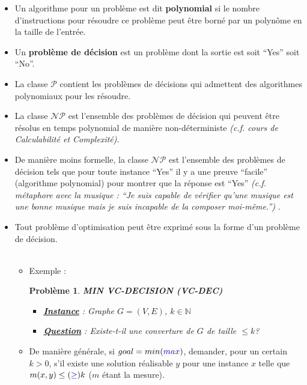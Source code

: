 \documentclass[12pt]{article}
\newcommand{\titre}[1]{\textcolor{title}{#1}}
\newcommand{\blu}[1]{\textcolor{darkblue}{#1}}
\newcommand{\N}{\mathbb{N}}
\newtheorem{pbm}{Problème}[section]
\begin{document}
\begin{itemize}
\item Un algorithme pour un problème est dit \textbf{polynomial} si le nombre
d'instructions pour résoudre ce problème peut être borné par un polynôme en la
taille de l'entrée.
\item Un \textbf{problème de décision} est un problème dont la sortie est soit
``Yes'' soit ``No''.
\item La classe $\mathcal{P}$ contient les problèmes de décisions qui admettent
des algorithmes polynomiaux pour les résoudre.
\item La classe $\mathcal{NP}$ est l'ensemble des problèmes de décision qui
peuvent être résolus en temps polynomial de manière non-déterministe
\textit{(c.f. cours de Calculabilité et Complexité)}.
\item De manière moins formelle, la classe $\mathcal{NP}$ est l'ensemble des
problèmes de décision tels que pour toute instance ``Yes'' il y a une preuve
``facile'' (algorithme polynomial) pour montrer que la réponse est ``Yes''
\textit{(c.f. métaphore avec la musique : ``Je suis capable de vérifier qu'une
musique est une bonne musique mais je suis incapable de la composer moi-même.'')
}.
\item Tout problème d'optimisation peut être exprimé sous la forme d'un problème
de décision. \\$ $\\
\begin{itemize}
\item[$\rightarrow$] Exemple : \\
\indent \hbox{}
\begin{pbm}
\textbf{MIN VC-DECISION (\titre{VC-DEC})}
\begin{itemize}
\item[*]\textbf{\underline{Instance}} : Graphe $G=(V,E)$, $k \in \N$
\item[*]\textbf{\underline{Question}} : Existe-t-il une converture de $G$ de
taille $\leq k$?
\end{itemize}
\indent \hbox{}
\end{pbm}
\item[$\rightarrow$] De manière générale, si $goal=min(\blu{max})$, demander,
pour un certain $k>0$, s'il existe une solution réalisable
$y$ pour une instance $x$ telle que $m(x,y) \leq (\blu{\geq}) k$ ($m$ étant
la mesure).
\end{itemize}
\end{itemize}
\end{document}
